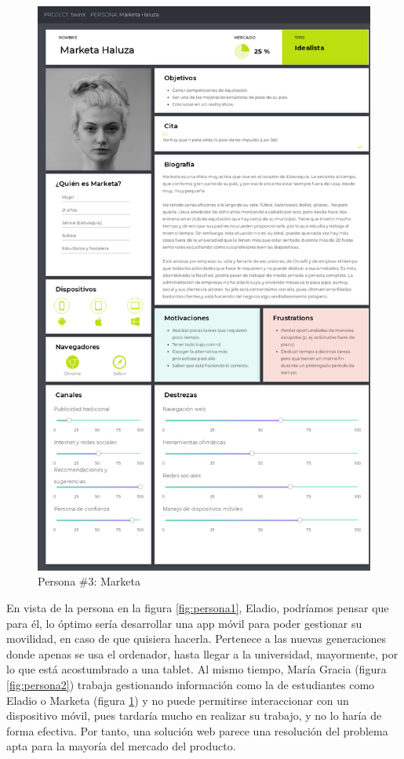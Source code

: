 \begin{figure}
	\centering
	\includegraphics[width=\textwidth, height=\textheight, keepaspectratio]{img/Personas/Marketa}
	\caption[Persona \#3]{Persona \#3: Marketa}
	\label{fig:persona3}
\end{figure}

En vista de la persona en la figura \ref{fig:persona1}, Eladio, podríamos pensar que para él, lo óptimo sería desarrollar una app móvil para poder gestionar su movilidad, en caso de que quisiera hacerla. Pertenece a las nuevas generaciones donde apenas se usa el ordenador, hasta llegar a la universidad, mayormente, por lo que está acostumbrado a una tablet. Al mismo tiempo, María Gracia (figura \ref{fig:persona2}) trabaja gestionando información como la de estudiantes como Eladio o Marketa (figura \ref{fig:persona3}) y no puede permitirse interaccionar con un dispositivo móvil, pues tardaría mucho en realizar su trabajo, y no lo haría de forma efectiva. Por tanto, una solución web parece una resolución del problema apta para la mayoría del mercado del producto.

